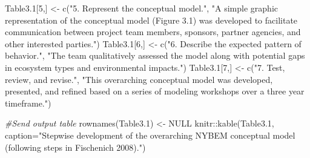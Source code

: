 \documentclass[
]{book}
\newenvironment{Shaded}{\begin{snugshade}}{\end{snugshade}}
\newcommand{\AttributeTok}[1]{\textcolor[rgb]{0.77,0.63,0.00}{#1}}
\newcommand{\CommentTok}[1]{\textcolor[rgb]{0.56,0.35,0.01}{\textit{#1}}}
\newcommand{\ConstantTok}[1]{\textcolor[rgb]{0.00,0.00,0.00}{#1}}
\newcommand{\DecValTok}[1]{\textcolor[rgb]{0.00,0.00,0.81}{#1}}
\newcommand{\FloatTok}[1]{\textcolor[rgb]{0.00,0.00,0.81}{#1}}
\newcommand{\FunctionTok}[1]{\textcolor[rgb]{0.00,0.00,0.00}{#1}}
\newcommand{\NormalTok}[1]{#1}
\newcommand{\OtherTok}[1]{\textcolor[rgb]{0.56,0.35,0.01}{#1}}
\newcommand{\SpecialCharTok}[1]{\textcolor[rgb]{0.00,0.00,0.00}{#1}}
\newcommand{\StringTok}[1]{\textcolor[rgb]{0.31,0.60,0.02}{#1}}
\begin{document}
\begin{Shaded}
\begin{Highlighting}[]
\NormalTok{Table3}\FloatTok{.1}\NormalTok{[}\DecValTok{5}\NormalTok{,] }\OtherTok{\textless{}{-}} \FunctionTok{c}\NormalTok{(}\StringTok{"5. Represent the conceptual model."}\NormalTok{, }\StringTok{"A simple graphic representation of the conceptual model (Figure 3.1) was developed to facilitate communication between project team members, sponsors, partner agencies, and other interested parties."}\NormalTok{)}
\NormalTok{Table3}\FloatTok{.1}\NormalTok{[}\DecValTok{6}\NormalTok{,] }\OtherTok{\textless{}{-}} \FunctionTok{c}\NormalTok{(}\StringTok{"6. Describe the expected pattern of behavior."}\NormalTok{, }\StringTok{"The team qualitatively assessed the model along with potential gaps in ecosystem types and environmental impacts."}\NormalTok{)}
\NormalTok{Table3}\FloatTok{.1}\NormalTok{[}\DecValTok{7}\NormalTok{,] }\OtherTok{\textless{}{-}} \FunctionTok{c}\NormalTok{(}\StringTok{"7. Test, review, and revise."}\NormalTok{, }\StringTok{"This overarching conceptual model was developed, presented, and refined based on a series of modeling workshops over a three year timeframe."}\NormalTok{)}

\CommentTok{\#Send output table}
\FunctionTok{rownames}\NormalTok{(Table3}\FloatTok{.1}\NormalTok{) }\OtherTok{\textless{}{-}} \ConstantTok{NULL}
\NormalTok{knitr}\SpecialCharTok{::}\FunctionTok{kable}\NormalTok{(Table3}\FloatTok{.1}\NormalTok{, }\AttributeTok{caption=}\StringTok{"Stepwise development of the overarching NYBEM conceptual model (following steps in Fischenich 2008)."}\NormalTok{)}
\end{Highlighting}
\end{Shaded}
\end{document}
